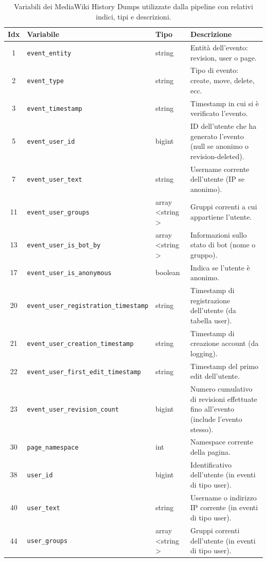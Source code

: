 \begin{table}[h]
\centering
\scriptsize
\begin{tabular}{|c|l|l|p{8cm}|}
\hline
\textbf{Idx} & \textbf{Variabile} & \textbf{Tipo} & \textbf{Descrizione} \\
\hline
1  & \texttt{event\_entity} & string & Entità dell'evento: revision, user o page. \\
2  & \texttt{event\_type} & string & Tipo di evento: create, move, delete, ecc. \\
3  & \texttt{event\_timestamp} & string & Timestamp in cui si è verificato l’evento. \\
5  & \texttt{event\_user\_id} & bigint & ID dell’utente che ha generato l’evento (null se anonimo o revision-deleted). \\
7  & \texttt{event\_user\_text} & string & Username corrente dell’utente (IP se anonimo). \\
11 & \texttt{event\_user\_groups} & array \textless string \textgreater & Gruppi correnti a cui appartiene l’utente. \\
13 & \texttt{event\_user\_is\_bot\_by} & array \textless string \textgreater & Informazioni sullo stato di bot (nome o gruppo). \\
17 & \texttt{event\_user\_is\_anonymous} & boolean & Indica se l’utente è anonimo. \\
20 & \texttt{event\_user\_registration\_timestamp} & string & Timestamp di registrazione dell’utente (da tabella user). \\
21 & \texttt{event\_user\_creation\_timestamp} & string & Timestamp di creazione account (da logging). \\
22 & \texttt{event\_user\_first\_edit\_timestamp} & string & Timestamp del primo edit dell’utente. \\
23 & \texttt{event\_user\_revision\_count} & bigint & Numero cumulativo di revisioni effettuate fino all’evento (include l’evento stesso). \\
30 & \texttt{page\_namespace} & int & Namespace corrente della pagina. \\
38 & \texttt{user\_id} & bigint & Identificativo dell’utente (in eventi di tipo user). \\
40 & \texttt{user\_text} & string & Username o indirizzo IP corrente (in eventi di tipo user). \\
44 & \texttt{user\_groups} & array \textless string \textgreater & Gruppi correnti dell’utente (in eventi di tipo user). \\
\hline
\end{tabular}
\caption{Variabili dei MediaWiki History Dumps utilizzate dalla pipeline con relativi indici, tipi e descrizioni.}
\label{tab:dump_variables_selected}
\end{table}


